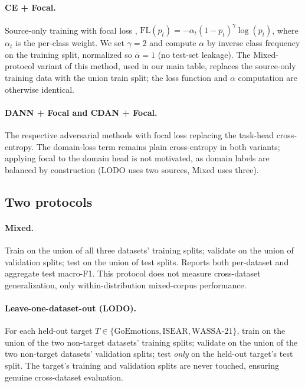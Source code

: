 \paragraph{CE + Focal.} Source-only training with focal loss
\citep{lin2017focal}, $\text{FL}(p_t) = -\alpha_t (1 - p_t)^\gamma
\log(p_t)$, where $\alpha_t$ is the per-class weight. We set
$\gamma=2$ and compute $\alpha$ by inverse class frequency on the
training split, normalized so $\overline{\alpha} = 1$ (no test-set
leakage). The Mixed-protocol variant of this method, used in our main
table, replaces the source-only training data with the union train
split; the loss function and $\alpha$ computation are otherwise
identical.

\paragraph{DANN + Focal and CDAN + Focal.} The respective adversarial
methods with focal loss replacing the task-head cross-entropy. The
domain-loss term remains plain cross-entropy in both variants;
applying focal to the domain head is not motivated, as domain labels
are balanced by construction (LODO uses two sources, Mixed uses three).

\subsection{Two protocols}
\label{sec:methods:protocols}

\paragraph{Mixed.} Train on the union of all three datasets' training
splits; validate on the union of validation splits; test on the union
of test splits. Reports both per-dataset and aggregate test macro-F1.
This protocol does not measure cross-dataset generalization, only
within-distribution mixed-corpus performance.

\paragraph{Leave-one-dataset-out (LODO).} For each held-out target
$T \in \{\text{GoEmotions}, \text{ISEAR}, \text{WASSA-21}\}$, train on
the union of the two non-target datasets' training splits; validate on
the union of the two non-target datasets' validation splits; test
\emph{only} on the held-out target's test split. The target's
training and validation splits are never touched, ensuring genuine
cross-dataset evaluation.

